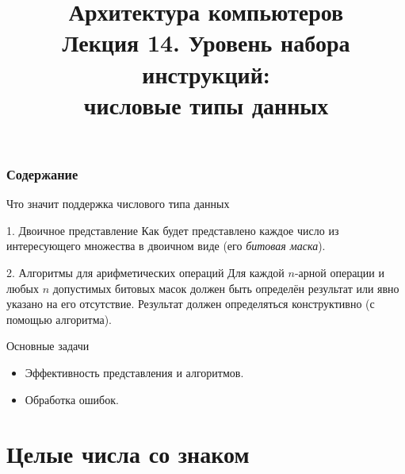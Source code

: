 \newcommand{\h}{%
handout,%
}



\title[Числовые типы данных]{Архитектура компьютеров\texorpdfstring{\\}{ }Лекция 14. Уровень набора инструкций:\texorpdfstring{\\}{}числовые типы данных}


\newcommand{\LRA}{\ensuremath{\leftrightarrow}}
\newcommand{\m}[1]{\texttt{#1}}


\begin{frame}
\titlepage
\end{frame}

\begin{frame}
\frametitle{Содержание}
\tableofcontents[hideallsubsections]
\end{frame}

\begin{frame}{Что значит поддержка числового типа данных}

\pause
\begin{block}{1. Двоичное представление}
    Как будет представлено каждое число из интересующего множества
    в двоичном виде (его \emph{битовая маска}).
\end{block}

\pause
\begin{block}{2. Алгоритмы для арифметических операций}
Для каждой $n$-арной операции и любых $n$ допустимых битовых масок
должен быть определён результат или явно указано на его отсутствие.
Результат должен определяться конструктивно (с помощью алгоритма).
\end{block}

\pause
\begin{block}{Основные задачи}
\pause
\begin{itemize}[<+->]
    \item Эффективность представления и алгоритмов.
    \item Обработка ошибок.
\end{itemize}
\end{block}

\end{frame}

\section{Целые числа со знаком}

